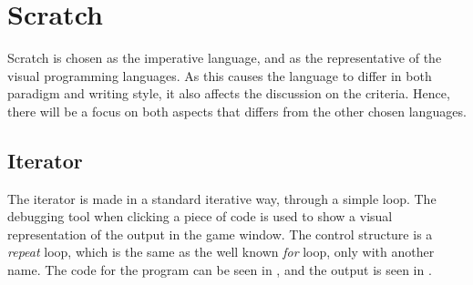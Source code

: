 \section{Scratch}
\label{sec:scratch}

Scratch is chosen as the imperative language, and as the representative of the visual programming languages. As this causes the language to differ in both paradigm and writing style, it also affects the discussion on the criteria. Hence, there will be a focus on both aspects that differs from the other chosen languages.

\subsection{Iterator}
The iterator is made in a standard iterative way, through a simple loop. The debugging tool when clicking a piece of code is used to show a visual representation of the output in the game window. The control structure is a \emph{repeat} loop, which is the same as the well known \emph{for} loop, only with another name. The code for the program can be seen in , and the output is seen in .

